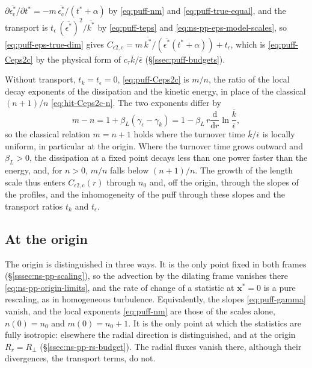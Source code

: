 \documentclass{article}
\begin{document}
$\partial \overline{\epsilon_{\mathrm{c}}^*}/\partial t^* = -m\, \overline{\epsilon_{\mathrm{c}}^*}/(t^* + \alpha)$
by \eqref{eq:puff-nm} and \eqref{eq:puff-true-equal}, and the transport is
$t_\epsilon\, (\overline{\epsilon^*})^2/\overline{k^*}$ by
\eqref{eq:puff-teps} and \eqref{eq:ns-pp-eps-model-scales}, so
\eqref{eq:puff-eps-true-dim} gives
$C_{\epsilon 2,\mathrm{c}} = m\, \overline{k^*}/(\overline{\epsilon^*}(t^* + \alpha)) + t_\epsilon$,
which is \eqref{eq:puff-Ceps2c} by the physical form of
$c_\tau \overline{k}/\overline{\epsilon}$ (\S\ref{ssec:puff-budgets}).
\par
Without transport, $t_k = t_\epsilon = 0$, \eqref{eq:puff-Ceps2c} is $m/n$,
the ratio of the local decay exponents of the dissipation and the kinetic
energy, in place of the classical $(n + 1)/n$ \eqref{eq:hit-Ceps2c-n}. The two
exponents differ by
\begin{equation}\label{eq:puff-m-minus-n}
  m - n = 1 + \beta_L \left( \gamma_\epsilon - \gamma_k \right)
  = 1 - \beta_L\, r \frac{\mathrm{d}}{\mathrm{d} r} \ln \frac{\overline{k}}{\overline{\epsilon}} ,
\end{equation}
so the classical relation $m = n + 1$ holds where the turnover time
$\overline{k}/\overline{\epsilon}$ is locally uniform, in particular at the
origin. Where the turnover time grows outward and $\beta_L > 0$, the
dissipation at a fixed point decays less than one power faster than the
energy, and, for $n > 0$, $m/n$ falls below $(n + 1)/n$. The growth of the length scale thus enters
$C_{\epsilon 2,\mathrm{c}}(r)$ through $n_0$ and, off the origin, through the
slopes of the profiles, and the inhomogeneity of the puff through these slopes
and the transport ratios $t_k$ and $t_\epsilon$.

\subsection{At the origin}\label{ssec:puff-origin}
The origin is distinguished in three ways. It is the only point fixed in both
frames (\S\ref{sssec:ns-pp-scaling}), so the advection by the dilating frame
vanishes there \eqref{eq:ns-pp-origin-limits}, and the rate of change of a
statistic at $\mathbf{x}^* = 0$ is a pure rescaling, as in homogeneous
turbulence. Equivalently, the slopes \eqref{eq:puff-gamma} vanish, and the
local exponents \eqref{eq:puff-nm} are those of the scales alone,
$n(0) = n_0$ and $m(0) = n_0 + 1$. It is the only point at which the
statistics are fully isotropic: elsewhere the radial direction is
distinguished, and at the origin $R_r = R_\perp$
(\S\ref{ssec:ns-pp-rs-budget}). The radial fluxes vanish there, although
their divergences, the transport terms, do not.
\end{document}

